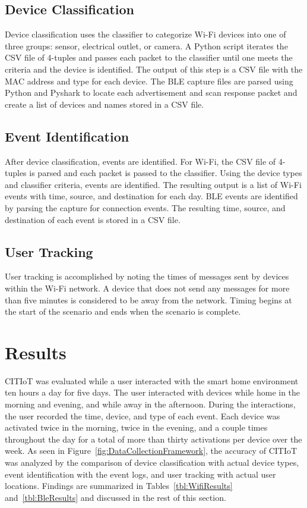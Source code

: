 \documentclass[conference]{./IEEEtran/IEEEtran}
\begin{document}
\subsection{Device Classification}
Device classification uses the classifier to categorize Wi-Fi devices into one of three groups: sensor, electrical outlet, or camera. A Python script iterates the \ac{CSV} file of 4-tuples and passes each packet to the classifier until one meets the criteria and the device is identified. The output of this step is a \ac{CSV} file with the \ac{MAC} address and type for each device. The \ac{BLE} capture files are parsed using Python and Pyshark to locate each advertisement and scan response packet and create a list of devices and names stored in a \ac{CSV} file.

\subsection{Event Identification}
After device classification, events are identified. For Wi-Fi, the \ac{CSV} file of 4-tuples is parsed and each packet is passed to the classifier. Using the device types and classifier criteria, events are identified. The resulting output is a list of Wi-Fi events with time, source, and destination for each day. \ac{BLE} events are identified by parsing the capture for connection events. The resulting time, source, and destination of each event is stored in a \ac{CSV} file.

\subsection{User Tracking}
User tracking is accomplished by noting the times of messages sent by devices within the Wi-Fi network. A device that does not send any messages for more than five minutes is considered to be away from the network. Timing begins at the start of the scenario and ends when the scenario is complete.

\section{Results}\label{results}
\figDataCollectionFramework
\ac{CITIoT} was evaluated while a user interacted with the smart home environment ten hours a day for five days. The user interacted with devices while home in the morning and evening, and while away in the afternoon. During the interactions, the user recorded the time, device, and type of each event. Each device was activated twice in the morning, twice in the evening, and a couple times throughout the day for a total of more than thirty activations per device over the week. As seen in Figure~\ref{fig:DataCollectionFramework}, the accuracy of \ac{CITIoT} was analyzed by the comparison of device classification with actual device types, event identification with the event logs, and user tracking with actual user locations. Findings are summarized in Tables~\ref{tbl:WifiResults} and~\ref{tbl:BleResults} and discussed in the rest of this section.  
\end{document}
